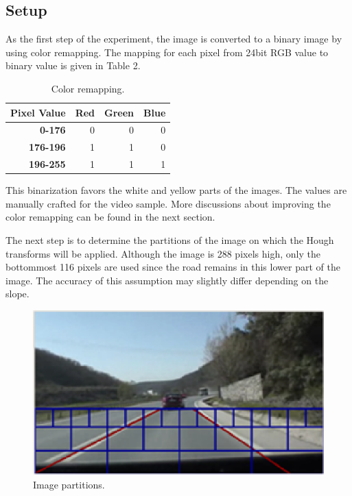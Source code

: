 \documentclass[a4paper,oneside,10pt]{article}
\begin{document}
\subsection{Setup}

As the first step of the experiment, the image is converted to a binary image by using color remapping. The mapping for each pixel from 24bit RGB value to binary value is given in Table 2.

\begin{table}
\caption{Color remapping.}
\centering
{\footnotesize
\begin{tabular}{|r|r|r|r|}
\hline
{\bf Pixel Value} & {\bf Red} & {\bf Green} & {\bf Blue} \\
\hline
{\bf 0-176} & 0 & 0 & 0 \\
\hline
{\bf 176-196} & 1 & 1 & 0 \\
\hline
{\bf 196-255} & 1 & 1 & 1 \\
\hline
\end{tabular}  
}  
\label{aba:table2}
\end{table}

\noindent This binarization favors the white and yellow parts of the images. The values are manually crafted for the video sample. More discussions about improving the color remapping can be found in the next section.

The next step is to determine the partitions of the image on which the Hough transforms will be applied. Although the image is 288 pixels high, only the bottommost 116 pixels are used since the road remains in this lower part of the image. The accuracy of this assumption may slightly differ depending on the slope.

\begin{figure}
\begin{center}
\includegraphics[scale=0.5]{fig3}
\end{center}
\caption{Image partitions.}
\label{aba:fig3}
\end{figure} 
\end{document}
